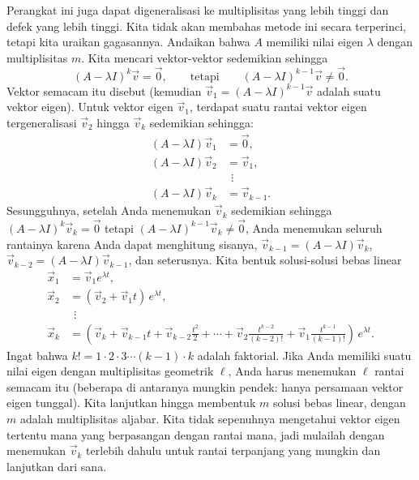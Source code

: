 Perangkat ini juga dapat digeneralisasi ke multiplisitas yang lebih tinggi
dan defek yang lebih tinggi.
Kita tidak akan membahas metode ini secara terperinci, tetapi kita uraikan gagasannya.
Andaikan bahwa $A$
memiliki nilai eigen $\lambda$ dengan multiplisitas $m$.
Kita mencari vektor-vektor sedemikian sehingga
\begin{equation*}
{(A - \lambda I)}^k \vec{v} = \vec{0},
\qquad \text{tetapi} \qquad
{(A - \lambda I)}^{k-1} \vec{v} \neq \vec{0}.
\end{equation*}
Vektor semacam itu disebut \emph{} (kemudian
$\vec{v}_1 = {(A - \lambda I)}^{k-1} \vec{v}$ adalah suatu vektor eigen).
Untuk
vektor eigen $\vec{v}_1$, terdapat suatu rantai vektor eigen tergeneralisasi
$\vec{v}_2$ hingga $\vec{v}_k$ sedemikian sehingga:
\begin{align*}
(A - \lambda I) \vec{v}_1 & = \vec{0} , \\
(A - \lambda I) \vec{v}_2 & = \vec{v}_1 , \\
& ~~\vdots \\
(A - \lambda I) \vec{v}_k & = \vec{v}_{k-1} .
\end{align*}
Sesungguhnya, setelah Anda menemukan $\vec{v}_k$ sedemikian sehingga
${(A - \lambda I)}^k \vec{v}_k = \vec{0}$ tetapi
${(A - \lambda I)}^{k-1} \vec{v}_k \neq \vec{0}$, Anda menemukan seluruh
rantainya karena Anda dapat menghitung sisanya,
$\vec{v}_{k-1} = (A - \lambda I) \vec{v}_k$,
$\vec{v}_{k-2} = (A - \lambda I) \vec{v}_{k-1}$, dan seterusnya.
Kita bentuk solusi-solusi bebas linear
\begin{align*}
\vec{x}_1 & = \vec{v}_1 e^{\lambda t} , \\
\vec{x}_2 & = ( \vec{v}_2 + \vec{v}_1 t ) \, e^{\lambda t} , \\
& ~~\vdots \\
\vec{x}_k & = \left( \vec{v}_k + \vec{v}_{k-1} t +
\vec{v}_{k-2} \frac{t^2}{2} +
\cdots + \vec{v}_2 \frac{t^{k-2}}{(k-2)!} + \vec{v}_1 \frac{t^{k-1}}{(k-1)!}
\right) \, e^{\lambda t} .
\end{align*}
Ingat bahwa $k! = 1 \cdot 2 \cdot 3 \cdots (k-1) \cdot k$ adalah faktorial.
Jika Anda memiliki suatu nilai eigen dengan multiplisitas geometrik $\ell$,
Anda harus menemukan $\ell$ rantai semacam itu (beberapa di antaranya mungkin
pendek: hanya persamaan vektor eigen tunggal).
Kita lanjutkan hingga membentuk $m$ solusi bebas linear, dengan
$m$ adalah multiplisitas aljabar.
Kita tidak sepenuhnya mengetahui vektor eigen tertentu mana yang berpasangan dengan rantai mana, jadi
mulailah dengan menemukan $\vec{v}_k$ terlebih dahulu untuk rantai terpanjang yang mungkin dan
lanjutkan dari sana.

